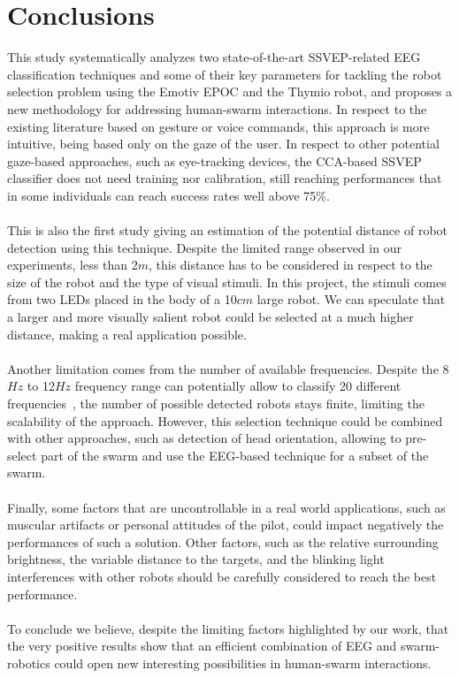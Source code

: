 \documentclass{svmult}
\begin{document}
\section{Conclusions}
This study systematically analyzes two state-of-the-art SSVEP-related EEG classification techniques and some of their key parameters for tackling the robot selection problem using the Emotiv EPOC and the Thymio robot, and proposes a new methodology for addressing human-swarm interactions. 
In respect to the existing literature based on gesture or voice commands, this approach is more intuitive, being based only on the gaze of the user. 
In respect to other potential gaze-based approaches, such as eye-tracking devices, the CCA-based SSVEP classifier does not need training nor calibration, still reaching performances that in some individuals can reach success rates well above 75\%.\\
\\
This is also the first study giving an estimation of the potential distance of robot detection using this technique.
Despite the limited range observed in our experiments, less than 2$m$, this distance has to be considered in respect to the size of the robot and the type of visual stimuli. In this project, the stimuli comes from two LEDs placed in the body of a 10$cm$ large robot. 
We can speculate that a larger and more visually salient robot could be selected at a much higher distance, making a real application possible.\\
\\
Another limitation comes from the number of available frequencies.
Despite the 8$Hz$ to 12$Hz$ frequency range can potentially allow to classify 20 different frequencies~\cite{SSVEPfiability}, the number of possible detected robots stays finite, limiting the scalability of the approach. 
However, this selection technique could be combined with other approaches, such as detection of head orientation, allowing to pre-select part of the swarm and use the EEG-based technique for a subset of the swarm.\\
\\
Finally, some factors that are uncontrollable in a real world applications, such as muscular artifacts or personal attitudes of the pilot, could impact negatively the performances of such a solution.
Other factors, such as the relative surrounding brightness, the variable distance to the targets, and the blinking light interferences with other robots should be carefully considered to reach the best performance. \\
\\
To conclude we believe, despite the limiting factors highlighted by our work, that the very positive results show that an efficient combination of EEG and swarm-robotics could open new interesting possibilities in human-swarm interactions.\\
\end{document}
